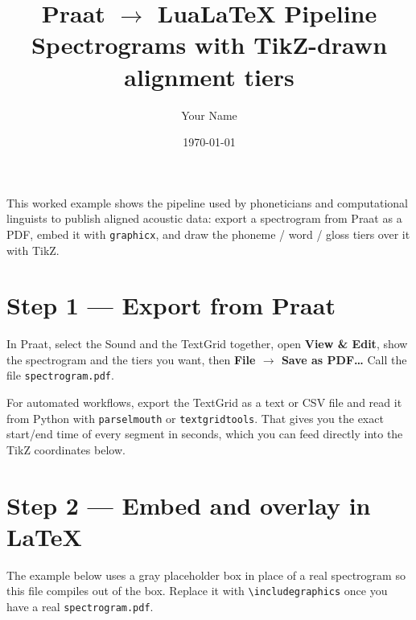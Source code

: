 \documentclass[11pt,a4paper]{article}
\title{Praat $\to$ LuaLaTeX Pipeline \\
       \large Spectrograms with TikZ-drawn alignment tiers}
\author{Your Name}
\date{\today}
\begin{document}
\maketitle

This worked example shows the pipeline used by phoneticians and computational
linguists to publish aligned acoustic data: export a spectrogram from Praat as
a PDF, embed it with \texttt{graphicx}, and draw the phoneme / word / gloss
tiers over it with TikZ.

\section{Step 1 --- Export from Praat}

In Praat, select the Sound and the TextGrid together, open \textbf{View \&
Edit}, show the spectrogram and the tiers you want, then \textbf{File $\to$
Save as PDF\ldots}  Call the file \texttt{spectrogram.pdf}.

For automated workflows, export the TextGrid as a text or CSV file and read it
from Python with \texttt{parselmouth} or \texttt{textgridtools}. That gives you
the exact start/end time of every segment in seconds, which you can feed
directly into the TikZ coordinates below.

\section{Step 2 --- Embed and overlay in LaTeX}

The example below uses a gray placeholder box in place of a real spectrogram
so this file compiles out of the box. Replace it with
\verb|\includegraphics| once you have a real \texttt{spectrogram.pdf}.
\end{document}
